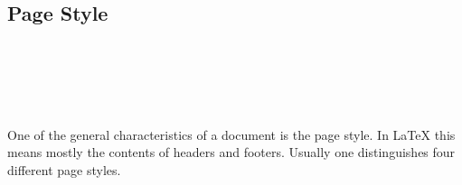 \subsection{Page Style}
\label{sec:maincls.pageStyle}

\begin{Declaration}
  \\
  \\
  \\
  \\
\end{Declaration}%
%
%
%
%
%
%
One of the general characteristics of a document is the page
style. In {\LaTeX} this means mostly the
contents of headers and footers. Usually one distinguishes four
different page styles.
